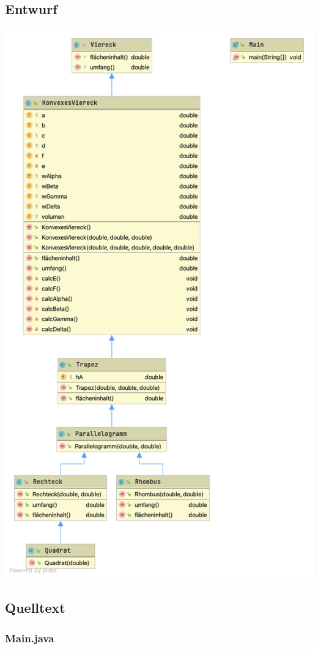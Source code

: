 \subsection{Entwurf}
\includegraphics[scale=0.55]{uml/uml_c7_p1.png}

\subsection{Quelltext}
\subsubsection{Main.java}\

